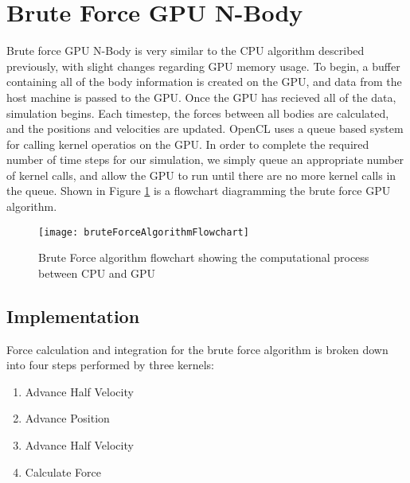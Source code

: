 \documentclass{thesis}
\begin{document}
\section{Brute Force GPU N-Body}
Brute force GPU N-Body is very similar to the CPU algorithm described previously, with slight changes regarding GPU memory usage. To begin, a buffer containing all of the body information is created on the GPU, and data from the host machine is passed to the GPU. Once the GPU has recieved all of the data, simulation begins. Each timestep, the forces between all bodies are calculated, and the positions and velocities are updated. OpenCL uses a queue based system for calling kernel operatios on the GPU. In order to complete the required number of time steps for our simulation, we simply queue an appropriate number of kernel calls, and allow the GPU to run until there are no more kernel calls in the queue. Shown in Figure \ref{fig:GPUBruteForceAlg} is a flowchart diagramming the brute force GPU algorithm.

\begin{figure}[h]
    \caption{Brute Force algorithm flowchart showing the computational process between CPU and GPU}
    \label{fig:GPUBruteForceAlg}
    \centering
    \texttt{[image: bruteForceAlgorithmFlowchart]}
\end{figure}

\subsection{Implementation}
Force calculation and integration for the brute force algorithm is broken down into four steps performed by three kernels:
\begin{enumerate}[noitemsep]
    \item Advance Half Velocity
    \item Advance Position
    \item Advance Half Velocity
    \item Calculate Force
\end{enumerate}
\end{document}
